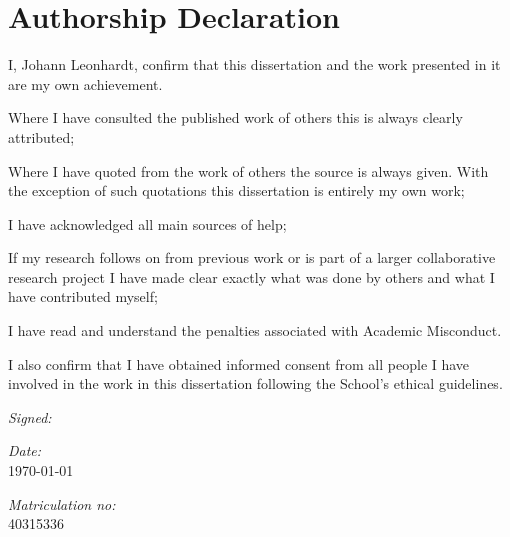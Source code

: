 \section*{Authorship Declaration}
\vspace{0.5cm}
\begin{flushleft}
I, Johann Leonhardt, confirm that this dissertation and the work presented in it are my own achievement.\newline

Where I have consulted the published work of others this is always clearly attributed;\newline

Where I have quoted from the work of others the source is always given. With the exception of such quotations this dissertation is entirely my own work;\newline

I have acknowledged all main sources of help;\newline

If my research follows on from previous work or is part of a larger collaborative research project I have made clear exactly what was done by others and what I have contributed myself;\newline

I have read and understand the penalties associated with Academic Misconduct.\newline

I also confirm that I have obtained informed consent from all people I have involved in the work in this dissertation following the School's ethical guidelines.\newline
\end{flushleft}

\begin{flushleft} \large
\emph{Signed:}\\
\end{flushleft}

\vspace{.5cm}

\begin{flushleft} \large
\emph{Date:}\\ \today
\end{flushleft}

\vspace{.5cm}

\begin{flushleft} \large
\emph{Matriculation no:}\\ 40315336
\end{flushleft}
